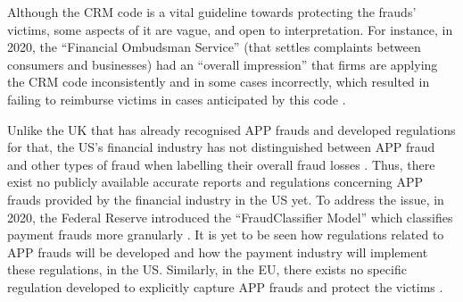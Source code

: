 Although the CRM code is a vital guideline towards protecting the frauds' victims, some aspects of it are vague, and open to interpretation. For instance, in 2020, the ``Financial Ombudsman Service'' (that settles complaints between consumers and businesses)  had an ``overall impression'' that firms are applying the CRM code inconsistently and in some cases incorrectly, which resulted in failing to reimburse victims in cases anticipated by this code \cite{Financial-Ombudsman-Service-response}.  %



Unlike the UK that has already recognised APP frauds and developed regulations for that,  the US's financial industry has not distinguished between APP fraud and other types of fraud when labelling their overall fraud losses \cite{P20-report}. Thus, there exist no publicly available accurate reports and regulations concerning APP frauds provided by the financial industry in the US yet.  To address the issue, in 2020, the Federal Reserve introduced the ``FraudClassifier Model'' which classifies payment frauds more granularly \cite{Fraud-Classifier}. It is yet to be seen how regulations related to APP frauds will be developed and how the payment industry will implement these regulations, in the US. Similarly, in the EU, there  exists no specific regulation developed 
%
%
%
to explicitly capture APP frauds and protect the victims \cite{kjorven2020pays,McIlroy2021}.














